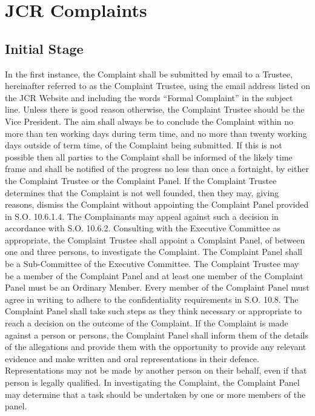 \section{JCR Complaints}
\subsection{Initial Stage}
\npara In the first instance, the Complaint shall be submitted by email to a Trustee, hereinafter referred to as the Complaint Trustee, using the email address listed on the JCR Website and including the words ``Formal Complaint'' in the subject line.  Unless there is good reason otherwise, the Complaint Trustee should be the Vice President.
\npara The aim shall always be to conclude the Complaint within no more than ten working days during term time, and no more than twenty working days outside of term time, of the Complaint being submitted. If this is not possible then all parties to the Complaint shall be informed of the likely time frame and shall be notified of the progress no less than once a fortnight, by either the Complaint Trustee or the Complaint Panel.
\npara If the Complaint Trustee determines that the Complaint is not well founded, then they may, giving reasons, dismiss the Complaint without appointing the Complaint Panel provided in S.O. 10.6.1.4. The Complainants may appeal against such a decision in accordance with S.O. 10.6.2.
\npara Consulting with the Executive Committee as appropriate, the Complaint Trustee shall appoint a Complaint Panel, of between one and three persons, to investigate the Complaint.  The Complaint Panel shall be a Sub-Committee of the Executive Committee.  The Complaint Trustee may be a member of the Complaint Panel and at least one member of the Complaint Panel must be an Ordinary Member.  Every member of the Complaint Panel must agree in writing to adhere to the confidentiality requirements in S.O. 10.8.
\npara The Complaint Panel shall take such steps as they think necessary or appropriate to reach a decision on the outcome of the Complaint.
\npara If the Complaint is made against a person or persons, the Complaint Panel shall inform them of the details of the allegations and provide them with the opportunity to provide any relevant evidence and make written and oral representations in their defence. Representations may not be made by another person on their behalf, even if that person is legally qualified.
\npara In investigating the Complaint, the Complaint Panel may determine that a task should be undertaken by one or more members of the panel.
